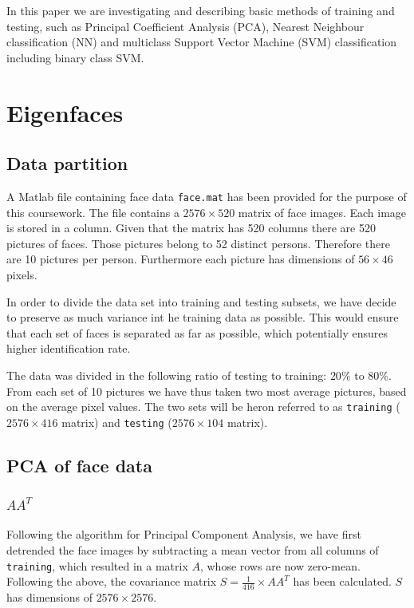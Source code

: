 \documentclass[10pt,twocolumn,letterpaper]{article}
\begin{document}
In this paper we are investigating and describing basic methods of training and testing, such as Principal Coefficient Analysis (PCA), Nearest Neighbour classification (NN) and multiclass Support Vector Machine (SVM) classification including binary class SVM. 

\section{Eigenfaces}

\subsection{Data partition}

A Matlab file containing face data {\tt\small face.mat} has been provided for the purpose of this coursework. The file contains a $2576 \times 520$ matrix of face images. Each image is stored in a column. Given that the matrix has 520 columns there are 520 pictures of faces. Those pictures belong to 52 distinct persons. Therefore there are 10 pictures per person. Furthermore each picture has dimensions of $56 \times 46$ pixels.

In order to divide the data set into training and testing subsets, we have decide to preserve as much variance int he training data as possible. This would ensure that each set of faces is separated as far as possible, which potentially ensures higher identification rate.

The data was divided in the following ratio of testing to training: $20\%$ to $80\%$. From each set of 10 pictures we have thus taken two most average pictures, based on the average pixel values. The two sets will be heron referred to as {\tt\small training} ($2576 \times 416$ matrix) and {\tt\small testing} ($2576 \times 104$ matrix).

\subsection{PCA of face data}
\subsubsection{\boldmath$AA^T$} \label{sec:aat}
Following the algorithm for Principal Component Analysis, we have first detrended the face images by subtracting a mean vector from all columns of {\tt\small training}, which resulted in a matrix $A$, whose rows are now zero-mean. Following the above, the covariance matrix $S=\frac{1}{416} \times AA^T$ has been calculated. $S$ has dimensions of $2576 \times 2576$.
\end{document}
